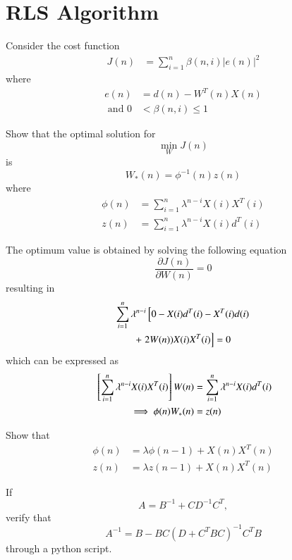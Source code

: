 \documentclass[journal,12pt,twocolumn]{IEEEtran}
\begin{document}
\section{RLS Algorithm}
Consider the cost function 
%
\begin{align*}
J(n) &= \sum_{i=1}^{n} \beta (n,i) |e(n)|^2
\end{align*}
%
where
\begin{align}
e(n) &= d(n) - W^{T}(n)X(n)
\\
\text{ and }0 &<\beta (n,i)\leq 1
\end{align}
\begin{problem}
Show that the optimal solution for
%
\begin{equation}
\min_{W} J(n)
\end{equation}
is
\begin{equation}
\label{eq:optW}
W_{*}(n) =\phi ^{-1} (n) z(n)
\end{equation}
where 
\begin{align}
\phi (n) &= \sum_{i=1}^{n} \lambda ^{n-i}X(i)X^{T}(i)
\\
z(n) &= \sum_{i=1}^{n} \lambda ^{n-i}X(i)d^{T}(i)
\end{align}
\end{problem}
\solution The optimum value is obtained by solving the following equation
\begin{equation}
\frac{\partial J(n)}{\partial W(n)}=0
\end{equation}
resulting in
\begin{multline}
\sum_{i=1}^{n} \lambda ^{n-i}{}\left[0 - X(i)d^{T}(i)-X^{T}(i)d(i)\right.
\\
+{}\left.2W(n))X(i)X^{T}(i)\right]=0
\end{multline}
which can be expressed as
\begin{align}
{}\left[\sum_{i=1}^{n} \lambda ^{n-i}X(i)X^{T}(i)\right]W(n)&=\sum_{i=1}^{n} \lambda ^{n-i}X(i)d^{T}(i)\\
\implies \phi (n) W_*(n) &=z(n)
\end{align}
\begin{problem}
Show that
\begin{align}
\label{eq:phin}
\phi (n)&=\lambda \phi (n-1) + X(n)X^{T}(n)
\\
z(n)&=\lambda z(n-1) + X(n)X^{T}(n)
\label{eq:zn}
\end{align}
\end{problem}
\begin{problem}
If
\begin{equation}
A=B^{-1}+CD^{-1}C^{T},
\end{equation}
verify that
\begin{equation}
\label{eq:mat_inv_form}
A^{-1}=B-BC(D+C^{T}BC)^{-1}C^{T}B
\end{equation}
%
through a python script.  
\end{problem}
\end{document}
